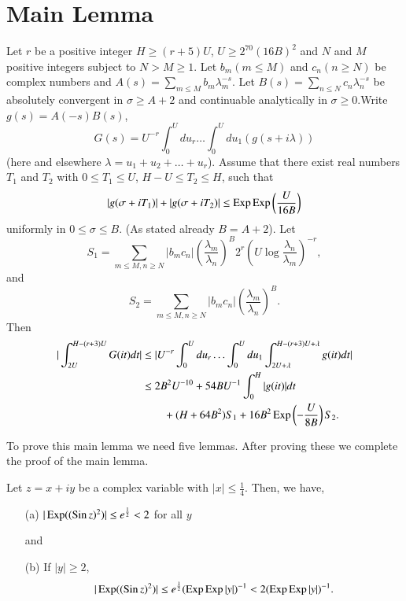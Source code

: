 \section{Main Lemma}\label{c2:sec2.2}
Let $r$ be a positive integer $H \geq (r+5) U$, $U\geq  2^{70}(16B)^2$ and $N$ and $M$ positive integers subject to $N > M \geq 1$. Let $b_m (m \leq M)$ and $c_n(n\geq N)$ be complex numbers and $A(s) = \sum\limits_{m \leq M} b_m \lambda^{-s}_m$. Let $B(s) = \sum\limits_{n \leq N} c_n \lambda^{-s}_n$ be absolutely convergent in $\sigma \geq A +2$ and continuable analytically in $\sigma \geq 0$.\pageoriginale Write $g(s) = A(-s) B(s)$,
$$
G(s) = U^{-r} \int^U_0 du_r \ldots \int^U_0 du_1 (g(s+i\lambda))
$$
(here and elsewhere $\lambda = u_1 + u_2 + \ldots + u_r$). Assume that there exist real numbers $T_1$ and $T_2$ with $0 \leq T_1 \leq U$, $H - U \leq T_2 \leq H$, such that
$$
|g(\sigma + iT_1)| + |g(\sigma + iT_2)| \leq \operatorname{Exp} \operatorname{Exp} \left(\frac{U}{16 B} \right)
$$
uniformly in $0 \leq \sigma \leq B$. (As stated already $B = A + 2$). Let 
$$
S_1 = \sum\limits_{m \leq M, n \geq N} |b_m c_n| \left(\frac{\lambda_m}{\lambda_n} \right)^B 2^r \left( U \log \frac{\lambda_n}{\lambda_m}\right)^{-r},
$$
and
$$
S_2 = \sum\limits_{m \leq M, n \geq N} |b_m c_n| \left( \frac{\lambda_m}{\lambda_n}\right)^B.
$$
Then
\begin{align*}
|\int^{H - (r+3) U}_{2U} G(it) dt| & \leq |U^{-r} \int^U_0 du_r \ldots \int^U_0 du_1 \int^{H-(r+3)U+\lambda}_{2U+\lambda} g(it) dt|\\
& \leq 2B^2 U^{-10} +  54 BU^{-1} \int^H_0 |g(it)| dt\\
& \qquad + (H + 64 B^2) S_1  + 16 B^2 \operatorname{Exp} \left(-\frac{U}{8B} \right) S_2. 
\end{align*}

To prove this main lemma we need five lemmas. After proving these we complete the proof of the main lemma.

\begin{sublemma}\label{c2:lem2.2.1}
Let $z = x+ iy$ be a complex variable with $|x| \leq \frac{1}{4}$. Then, we have,
\begin{itemize}
\item[{\rm (a)}] $|\operatorname{Exp} ((\operatorname{Sin} z)^2)| \leq e^{\frac{1}{2}} < 2$ for all $y$

and

\item[{\rm (b)}] If $|y|\geq 2$,
$$
|\operatorname{Exp} ((\operatorname{Sin} z)^2)| \leq e^{\frac{1}{2}} (\operatorname{Exp} \operatorname{Exp} |y|)^{-1} < 2 (\operatorname{Exp} \operatorname{Exp} |y|)^{-1} .
$$
\end{itemize}
\end{sublemma}

